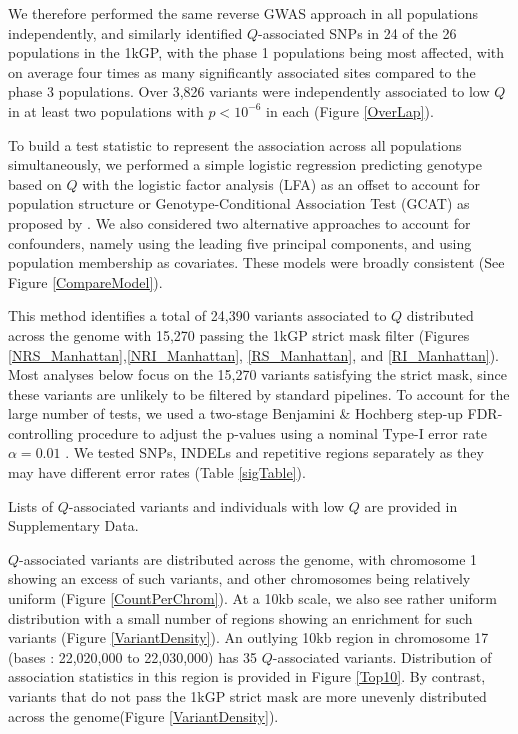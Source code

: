 \documentclass[9pt,lineno]{template}
\begin{document}
We therefore performed the same reverse GWAS approach in all populations independently, and similarly identified $Q$-associated SNPs in 24 of the 26 populations in the 1kGP, with the phase 1 populations being most affected, with on average four times as many significantly associated sites compared to the phase 3 populations.
Over 3,826 variants were independently associated to low $Q$ in at least two populations with $ p < 10^{-6}$ in each (Figure \ref{OverLap}).

To build a test statistic to represent the association across all populations simultaneously, we performed a simple logistic regression predicting genotype based on $Q$ with the logistic factor analysis (LFA) as an offset to account for population structure or Genotype-Conditional Association Test  (GCAT) as proposed by \citep{song2015testing}. 
We also considered two alternative approaches to account for confounders, namely using the leading five  principal components, and using population membership as covariates. 
These models were broadly consistent (See Figure \ref{CompareModel}).

This method identifies a total of 24,390 variants associated to $Q$ distributed across the genome with 15,270 passing the 1kGP strict mask filter (Figures \ref{NRS_Manhattan},\ref{NRI_Manhattan}, \ref{RS_Manhattan}, and \ref{RI_Manhattan}). Most analyses below focus on the 15,270 variants satisfying the strict mask, since these variants are unlikely to be filtered by standard pipelines.
To account for the large number of tests, we used a two-stage Benjamini \& Hochberg step-up FDR-controlling procedure to adjust the p-values using a nominal Type-I error rate $\alpha = 0.01$ \citep{Benjamini2006}. 
We tested SNPs, INDELs and repetitive regions separately as they may have different error rates (Table \ref{sigTable}).

Lists of $Q$-associated variants and individuals with low $Q$ are provided in Supplementary Data.

$Q$-associated variants are distributed across the genome, with chromosome 1 showing an excess of such variants, and other chromosomes being relatively uniform (Figure \ref{CountPerChrom}).
At a 10kb scale, we also see rather uniform distribution with a small number of regions showing an enrichment for such variants (Figure \ref{VariantDensity}).
An outlying 10kb region in chromosome 17 (bases : 22,020,000 to  22,030,000) has 35 $Q$-associated variants.
Distribution of association statistics in this region is provided in Figure \ref{Top10}.
By contrast, variants that do not pass the 1kGP strict mask are more unevenly distributed across the genome(Figure \ref{VariantDensity}).
\end{document}
